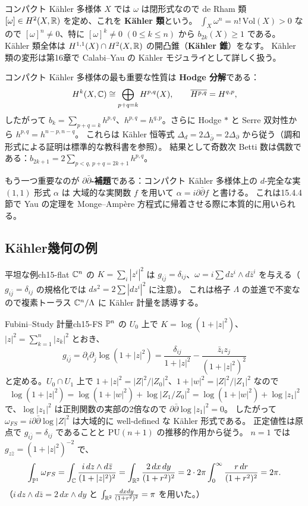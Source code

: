 コンパクト K\"ahler 多様体 $X$ では $\omega$ は閉形式なので de Rham 類 $[\omega]\in H^2(X,\mathbb{R})$ を定め、これを \textbf{K\"ahler 類}という。
$\int_X\omega^n = n!\,\mathrm{Vol}(X) > 0$ なので $[\omega]^n\neq 0$、特に $[\omega]^k\neq 0$ $(0\le k\le n)$ から $b_{2k}(X)\geq 1$ である。
K\"ahler 類全体は $H^{1,1}(X)\cap H^2(X,\mathbb{R})$ の開凸錐（\textbf{K\"ahler 錐}）をなす。
K\"ahler 類の変形は第16章で Calabi--Yau の K\"ahler モジュライとして詳しく扱う。

コンパクト K\"ahler 多様体の最も重要な性質は \textbf{Hodge 分解}である：
\[
H^k(X,\mathbb{C}) \cong \bigoplus_{p+q=k} H^{p,q}(X),\qquad \overline{H^{p,q}} = H^{q,p},
\]
したがって $b_k = \sum_{p+q=k}h^{p,q}$、$h^{p,q} = h^{q,p}$。さらに Hodge $*$ と Serre 双対性から $h^{p,q} = h^{n-p,n-q}$。
これらは K\"ahler 恒等式 $\Delta_d = 2\Delta_{\bar\partial} = 2\Delta_\partial$ から従う（調和形式による証明は標準的な教科書を参照）。
結果として奇数次 Betti 数は偶数である：$b_{2k+1} = 2\sum_{p<q,\,p+q=2k+1}h^{p,q}$。

もう一つ重要なのが \textbf{$\partial\bar\partial$-補題}である：コンパクト K\"ahler 多様体上の $d$-完全な実 $(1,1)$ 形式 $\alpha$ は
大域的な実関数 $f$ を用いて $\alpha = i\partial\bar\partial f$ と書ける。
これは15.4.4節で Yau の定理を Monge--Amp\`ere 方程式に帰着させる際に本質的に用いられる。

\subsection{K\"ahler幾何の例}

\begin{myex}{平坦な例}{ch15-flat}
$\mathbb{C}^n$ の $K = \sum_i |z^i|^2$ は $g_{i\bar j} = \delta_{ij}$、$\omega = i\sum dz^i\wedge d\bar z^i$ を与える（$g_{i\bar j}=\delta_{ij}$ の規格化では $ds^2 = 2\sum|dz^i|^2$ に注意）。
これは格子 $\Lambda$ の並進で不変なので複素トーラス $\mathbb{C}^n/\Lambda$ に K\"ahler 計量を誘導する。
\end{myex}

\begin{myex}{Fubini--Study 計量}{ch15-FS}
$\mathbb{P}^n$ の $U_0$ 上で $K = \log(1+|z|^2)$、$|z|^2 = \sum_{k=1}^n|z_k|^2$ とおき、
\[
g_{i\bar j} = \partial_i\partial_{\bar j}\log(1+|z|^2) = \frac{\delta_{ij}}{1+|z|^2} - \frac{\bar z_i z_j}{(1+|z|^2)^2}
\]
と定める。$U_0\cap U_1$ 上で $1+|z|^2 = |Z|^2/|Z_0|^2$、$1+|w|^2 = |Z|^2/|Z_1|^2$ なので
\[
\log(1+|z|^2) = \log(1+|w|^2) + \log|Z_1/Z_0|^2 = \log(1+|w|^2) + \log|z_1|^2
\]
で、$\log|z_1|^2$ は正則関数の実部の2倍なので $\partial\bar\partial\log|z_1|^2 = 0$。
したがって $\omega_{FS} = i\partial\bar\partial\log|Z|^2$ は大域的に well-defined な K\"ahler 形式である。
正定値性は原点で $g_{i\bar j}=\delta_{ij}$ であることと $\mathrm{PU}(n+1)$ の推移的作用から従う。
$n=1$ では $g_{z\bar z} = (1+|z|^2)^{-2}$ で、
\[
\int_{\mathbb{P}^1}\omega_{FS} = \int_{\mathbb{C}} \frac{i\,dz\wedge d\bar z}{(1+|z|^2)^2} = \int_{\mathbb{R}^2}\frac{2\,dx\,dy}{(1+r^2)^2} = 2\cdot 2\pi\int_0^\infty\frac{r\,dr}{(1+r^2)^2} = 2\pi .
\]
（$i\,dz\wedge d\bar z = 2\,dx\wedge dy$ と $\int_{\mathbb{R}^2}\frac{dxdy}{(1+r^2)^2} = \pi$ を用いた。）
\end{myex}

